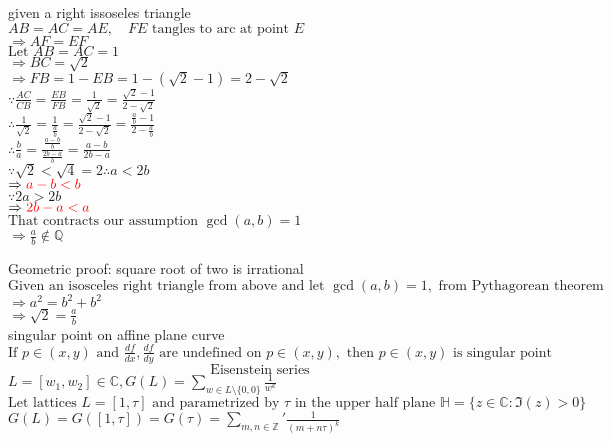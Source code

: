 \documentclass{book}
\begin{document}
given a right issoseles triangle\\
$AB = AC = AE, \quad FE \text{  tangles to arc at point } E $\\
$\Rightarrow AF = EF$\\
$\text{Let } AB = AC = 1$\\
$\Rightarrow BC = \sqrt{2}$\\
$\Rightarrow FB = 1-EB = 1-(\sqrt{2} - 1) = 2-\sqrt{2}$\\
$\because \frac{AC}{CB} = \frac{EB}{FB} = \frac{1}{\sqrt{2}} = \frac{\sqrt{2}-1}{2-\sqrt{2}}$\\
$\therefore \frac{1}{\sqrt{2}} =\frac{1}{\frac{a}{b}} = \frac{\sqrt{2}-1}{2-\sqrt{2}} = \frac{\frac{a}{b} - 1}{2-\frac{a}{b}}$\\
$\therefore \frac{b}{a} = \frac{ \frac{a-b}{b} } {\frac{2b - a}{b}} = \frac{a-b}{2b-a}$\\
$\because \sqrt{2} < \sqrt{4} = 2 \therefore  a < 2b $\\
$\Rightarrow  \color{red} a-b < b $\\
$\because 2a > 2b$\\
$\Rightarrow  \color{red}2b -a < a$\\
$\text{That contracts our assumption } \gcd(a, b) = 1$\\
$\Rightarrow \frac{a}{b} \notin \mathbb{Q}$

\pagebreak
\noindent
Geometric proof: square root of two is irrational\\
$\text{Given an isosceles right triangle from above and let } \gcd(a, b)=1, \text{ from Pythagorean theorem}$\\
$\Rightarrow a^2 = b^2 + b^2$\\
$\Rightarrow \sqrt{2} = \frac{a}{b}$\\

singular point on affine plane curve\\
$\text{If } p \in (x, y) \text{ and } \frac{df}{dx}, \frac{df}{dy} \text{ are undefined on } p \in (x, y), \text{ then } p\in (x, y) \text{ is singular point}$\\


\[\text{Eisenstein series}\]
$L = [w_1, w_2] \in \mathbb{C}, G(L) = \sum_{w\in L\setminus \{0, 0\}} \frac{1}{w^k}$\\
$\text{Let lattices } L=[1, \tau] \text{ and parametrized by }\tau  \text{ in the upper half plane } \mathbb{H} = \{ z \in\mathbb{C} : \Im(z) > 0 \} $\\
$G(L) = G([1, \tau]) =G(\tau) = \sum_{m, n \in \mathbb{Z}}' \frac{1}{(m+n\tau)^k}$\\
\end{document}
